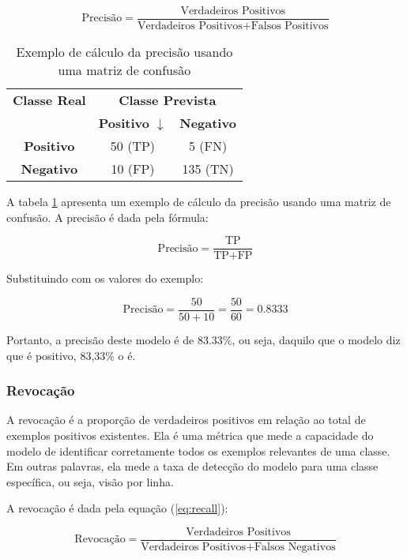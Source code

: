 \begin{equation}
\text{Precisão} = \frac{\text{Verdadeiros Positivos}}{\text{Verdadeiros Positivos} + \text{Falsos Positivos}} \label{eq:precision}
\end{equation}

\begin{table}[h]
\centering
\caption{Exemplo de cálculo da precisão usando uma matriz de confusão}
\label{tab:exemplo_precisao}
\begin{tabular}{c|cc}
\multicolumn{1}{c}{\textbf{Classe Real}} & \multicolumn{2}{c}{\textbf{Classe Prevista}} \\ \cline{2-3}
\multicolumn{1}{c}{} & \textbf{Positivo} $\downarrow$& \textbf{Negativo} \\ \hline
\multicolumn{1}{c}{\textbf{Positivo}} & \cellcolor{green!25}50 (TP) & \cellcolor{red!25}5 (FN) \\
\multicolumn{1}{c}{\textbf{Negativo}} & \cellcolor{red!25}10 (FP)  & \cellcolor{green!25}135 (TN) \\ \hline
\end{tabular}
\end{table}

A tabela \ref{tab:exemplo_precisao} apresenta um exemplo de cálculo da precisão usando uma matriz de confusão. A precisão é dada pela fórmula:

\[ \text{Precisão} = \frac{\text{TP}}{\text{TP} + \text{FP}} \]

Substituindo com os valores do exemplo:

\[ \text{Precisão} = \frac{50}{50 + 10} = \frac{50}{60} = 0.8333 \]

Portanto, a precisão deste modelo é de 83.33\%, ou seja, daquilo que o modelo diz que é positivo, 83,33\% o é.

\subsubsection{Revocação}

A revocação é a proporção de verdadeiros positivos em relação ao total de exemplos positivos existentes. Ela é uma métrica que mede a capacidade do modelo de identificar corretamente todos os exemplos relevantes de uma classe. Em outras palavras, ela mede a taxa de detecção do modelo para uma classe específica, ou seja, visão por linha.

A revocação é dada pela equação (\ref{eq:recall}):

\begin{equation}
\text{Revocação} = \frac{\text{Verdadeiros Positivos}}{\text{Verdadeiros Positivos} + \text{Falsos Negativos}} \label{eq:recall}
\end{equation}

